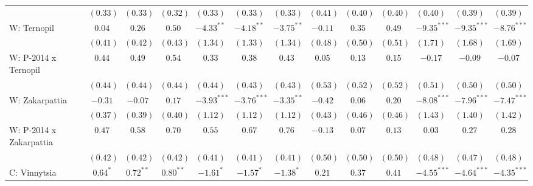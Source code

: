 \begin{table}
\begin{center}
\begin{tiny}
\begin{tabular}{l c c c c c c c c c c c c}
                            & $(0.33)$      & $(0.33)$      & $(0.32)$       & $(0.33)$      & $(0.33)$      & $(0.33)$      & $(0.41)$      & $(0.40)$       & $(0.40)$       & $(0.40)$       & $(0.39)$       & $(0.39)$       \\
W: Ternopil                 & $0.04$        & $0.26$        & $0.50$         & $-4.33^{**}$  & $-4.18^{**}$  & $-3.75^{**}$  & $-0.11$       & $0.35$         & $0.49$         & $-9.35^{***}$  & $-9.35^{***}$  & $-8.76^{***}$  \\
                            & $(0.41)$      & $(0.42)$      & $(0.43)$       & $(1.34)$      & $(1.33)$      & $(1.34)$      & $(0.48)$      & $(0.50)$       & $(0.51)$       & $(1.71)$       & $(1.68)$       & $(1.69)$       \\
W: P-2014 x Ternopil        & $0.44$        & $0.49$        & $0.54$         & $0.33$        & $0.38$        & $0.43$        & $0.05$        & $0.13$         & $0.15$         & $-0.17$        & $-0.09$        & $-0.07$        \\
                            & $(0.44)$      & $(0.44)$      & $(0.44)$       & $(0.44)$      & $(0.43)$      & $(0.43)$      & $(0.53)$      & $(0.52)$       & $(0.52)$       & $(0.51)$       & $(0.50)$       & $(0.50)$       \\
W: Zakarpattia              & $-0.31$       & $-0.07$       & $0.17$         & $-3.93^{***}$ & $-3.76^{***}$ & $-3.35^{**}$  & $-0.42$       & $0.06$         & $0.20$         & $-8.08^{***}$  & $-7.96^{***}$  & $-7.47^{***}$  \\
                            & $(0.37)$      & $(0.39)$      & $(0.40)$       & $(1.12)$      & $(1.12)$      & $(1.12)$      & $(0.43)$      & $(0.46)$       & $(0.46)$       & $(1.43)$       & $(1.40)$       & $(1.42)$       \\
W: P-2014 x Zakarpattia     & $0.47$        & $0.58$        & $0.70$         & $0.55$        & $0.67$        & $0.76$        & $-0.13$       & $0.07$         & $0.13$         & $0.03$         & $0.27$         & $0.28$         \\
                            & $(0.42)$      & $(0.42)$      & $(0.42)$       & $(0.41)$      & $(0.41)$      & $(0.41)$      & $(0.50)$      & $(0.50)$       & $(0.50)$       & $(0.48)$       & $(0.47)$       & $(0.48)$       \\
C: Vinnytsia                & $0.64^{*}$    & $0.72^{**}$   & $0.80^{**}$    & $-1.61^{*}$   & $-1.57^{*}$   & $-1.38^{*}$   & $0.21$        & $0.37$         & $0.41$         & $-4.55^{***}$  & $-4.64^{***}$  & $-4.35^{***}$  \\

\end{tabular}
\end{tiny}
\end{center}
\end{table}
